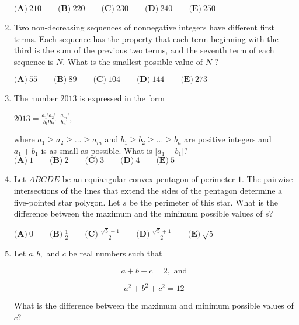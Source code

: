 \documentclass{article}
\begin{document}
\begin{enumerate}[label=\arabic*., itemsep=0.5em]
\(\textbf{(A)}\ 210 \qquad \textbf{(B)}\ 220 \qquad \textbf{(C)}\ 230 \qquad \textbf{(D)}\ 240 \qquad \textbf{(E)}\ 250\)\par \vspace{0.5em}\item Two non-decreasing sequences of nonnegative integers have different first terms. Each sequence has the property that each term beginning with the third is the sum of the previous two terms, and the seventh term of each sequence is \(N\). What is the smallest possible value of \(N\) ?

\(\textbf{(A)}\ 55 \qquad \textbf{(B)}\ 89 \qquad \textbf{(C)}\ 104 \qquad \textbf{(D)}\ 144 \qquad \textbf{(E)}\ 273\)\par \vspace{0.5em}\item The number \(2013\) is expressed in the form \begin{center}
\(2013 = \frac {a_1!a_2!...a_m!}{b_1!b_2!...b_n!}\),
\end{center}
where \(a_1 \ge a_2 \ge ... \ge a_m\) and \(b_1 \ge b_2 \ge ... \ge b_n\) are positive integers and \(a_1 + b_1\) is as small as possible. What is \(|a_1 - b_1|\)?
\(\textbf{(A)}\ 1 \qquad \textbf{(B)}\ 2 \qquad \textbf{(C)}\ 3 \qquad \textbf{(D)}\ 4 \qquad \textbf{(E)}\ 5\)\par \vspace{0.5em}\item Let \(ABCDE\) be an equiangular convex pentagon of perimeter \(1\). The pairwise intersections of the lines that extend the sides of the pentagon determine a five-pointed star polygon. Let \(s\) be the perimeter of this star. What is the difference between the maximum and the minimum possible values of \(s\)?

\(\textbf{(A)}\ 0 \qquad \textbf{(B)}\ \frac{1}{2} \qquad \textbf{(C)}\ \frac{\sqrt{5}-1}{2} \qquad \textbf{(D)}\  \frac{\sqrt{5}+1}{2} \qquad \textbf{(E)}\ \sqrt{5}\)\par \vspace{0.5em}\item Let \(a,b,\) and \(c\) be real numbers such that 


\begin{equation*}
a+b+c=2, \text{ and}
\end{equation*}


\begin{equation*}
a^2+b^2+c^2=12
\end{equation*}


What is the difference between the maximum and minimum possible values of \(c\)?


\end{enumerate}
\end{document}
